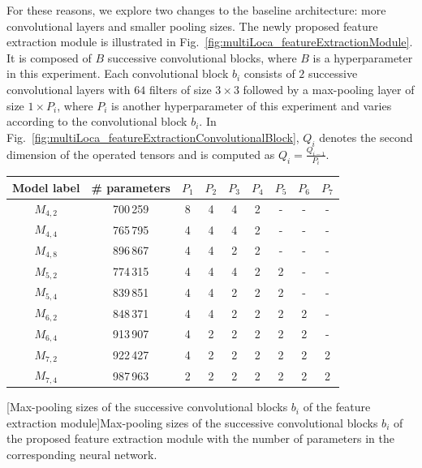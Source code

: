 For these reasons, we explore two changes to the baseline architecture: more convolutional layers and smaller pooling sizes. The newly proposed feature extraction module is illustrated in Fig.~\ref{fig:multiLoca_featureExtractionModule}. It is composed of $B$ successive convolutional blocks, where $B$ is a hyperparameter in this experiment. Each convolutional block $b_i$ consists of $2$ successive convolutional layers with $64$ filters of size $3 \times 3$ followed by a max-pooling layer of size $1 \times P_i$, where $P_i$ is another hyperparameter of this experiment and varies according to the convolutional block $b_i$. In Fig.~\ref{fig:multiLoca_featureExtractionConvolutionalBlock}, $Q_i$ denotes the second dimension of the operated tensors and is computed as $Q_i = \frac{Q_{i-1}}{P_i}$.

\begin{table}[t]
\centering
    \begin{tabular}{|c|c|c|c|c|c|c|c|c|}
        \hline
        \textbf{Model label} & \textbf{\# parameters} & \textbf{$P_1$} & \textbf{$P_2$} & \textbf{$P_3$} & \textbf{$P_4$} & \textbf{$P_5$} & \textbf{$P_6$} & \textbf{$P_7$} \\\hline
        $M_{4,2}$ & 700\,259 & 8 & 4 & 4 & 2 & - & - & - \\
        $M_{4,4}$ & 765\,795 & 4 & 4 & 4 & 2 & - & - & - \\
        $M_{4,8}$ & 896\,867 & 4 & 4 & 2 & 2 & - & - & - \\
        $M_{5,2}$ & 774\,315 & 4 & 4 & 4 & 2 & 2 & - & - \\
        $M_{5,4}$ & 839\,851 & 4 & 4 & 2 & 2 & 2 & - & - \\
        $M_{6,2}$ & 848\,371 & 4 & 4 & 2 & 2 & 2 & 2 & - \\
        $M_{6,4}$ & 913\,907 & 4 & 2 & 2 & 2 & 2 & 2 & - \\
        $M_{7,2}$ & 922\,427 & 4 & 2 & 2 & 2 & 2 & 2 & 2 \\
        $M_{7,4}$ & 987\,963 & 2 & 2 & 2 & 2 & 2 & 2 & 2 \\
        \hline
    \end{tabular}
    
    [Max-pooling sizes of the successive convolutional blocks $b_i$ of the feature extraction module]{Max-pooling sizes of the successive convolutional blocks $b_i$ of the proposed feature extraction module with the number of parameters in the corresponding neural network.}
    \label{tab:featureExtractionModuleHyperparameters}
\end{table}

